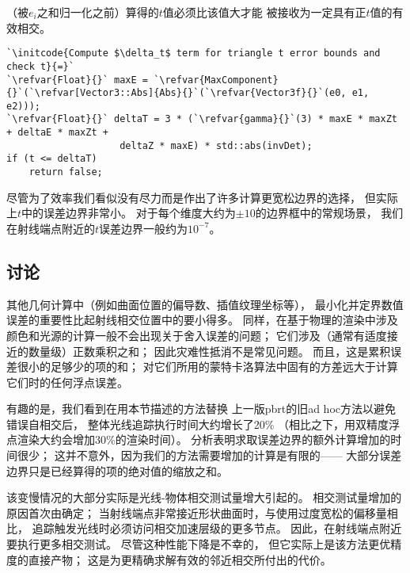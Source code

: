 （被$e_i$之和归一化之前）算得的$t$值必须比该值大才能
被接收为一定具有正$t$值的有效相交。
\begin{lstlisting}
`\initcode{Compute $\delta_t$ term for triangle t error bounds and check t}{=}`
`\refvar{Float}{}` maxE = `\refvar{MaxComponent}{}`(`\refvar[Vector3::Abs]{Abs}{}`(`\refvar{Vector3f}{}`(e0, e1, e2)));
`\refvar{Float}{}` deltaT = 3 * (`\refvar{gamma}{}`(3) * maxE * maxZt + deltaE * maxZt +
                    deltaZ * maxE) * std::abs(invDet);
if (t <= deltaT)
    return false;
\end{lstlisting}

尽管为了效率我们看似没有尽力而是作出了许多计算更宽松边界的选择，
但实际上$t$中的误差边界非常小。
对于每个维度大约为$\pm10$的边界框中的常规场景，
我们在射线端点附近的$t$误差边界一般约为$10^{-7}$。

\subsection{讨论}\label{sub:讨论}
其他几何计算中（例如曲面位置的偏导数、插值纹理坐标等），
最小化并定界数值误差的重要性比起射线相交位置中的要小得多。
同样，在基于物理的渲染中涉及颜色和光源的计算一般不会出现关于舍入误差的问题；
它们涉及（通常有适度接近的数量级）正数乘积之和；
因此灾难性抵消不是常见问题。
而且，这是累积误差很小的足够少的项的和；
对它们所用的蒙特卡洛算法中固有的方差远大于计算它们时的任何浮点误差。

有趣的是，我们看到在用本节描述的方法替换
上一版pbrt的旧ad hoc方法以避免错误自相交后，
整体光线追踪执行时间大约增长了20\%
（相比之下，用双精度浮点渲染大约会增加30\%的渲染时间）。
分析表明求取误差边界的额外计算增加的时间很少；
这并不意外，因为我们的方法需要增加的计算是有限的——
大部分误差边界只是已经算得的项的绝对值的缩放之和。

该变慢情况的大部分实际是光线-物体相交测试量增大引起的。
相交测试量增加的原因首次由\citet[p.30]{Wächter_2008}确定；
当射线端点非常接近形状曲面时，与使用过度宽松的偏移量相比，
追踪触发光线时必须访问相交加速层级的更多节点。
因此，在射线端点附近要执行更多相交测试。
尽管这种性能下降是不幸的，
但它实际上是该方法更优精度的直接产物；
这是为更精确求解有效的邻近相交所付出的代价。